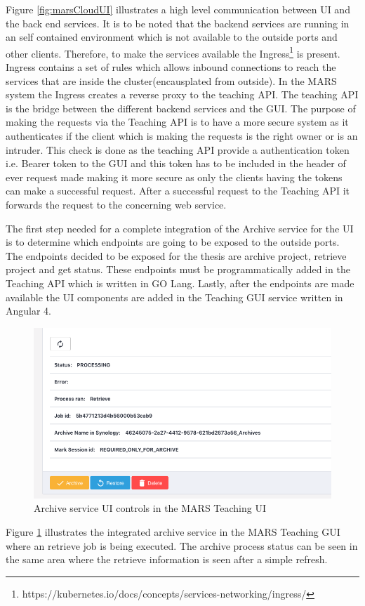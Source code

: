 Figure \ref{fig:marsCloudUI} illustrates a high level communication between UI and the back end services. It is to be noted that the backend services
are running in an self contained environment which is not available to the outside ports and other clients. Therefore, 
to make the services available the Ingress\footnote{https://kubernetes.io/docs/concepts/services-networking/ingress/} is present. Ingress contains
a set of rules which allows inbound connections to reach the services that are inside the cluster(encausplated from outside). In the MARS system
the Ingress creates a reverse proxy to the teaching API. The teaching API is the bridge between the different backend services and the GUI. The purpose
of making the requests via the Teaching API is to have a more secure system as it authenticates if the client which is making the requests is the right owner or 
is an intruder. This check is done as the teaching API provide a authentication token i.e. Bearer token to the GUI and this token has to be included in the
header of ever request made making it more secure as only the clients having the tokens can make a successful request. After a successful request to the Teaching API
it forwards the request to the concerning web service.


The first step needed for a complete integration of the Archive service for the UI is to determine which endpoints are going to be exposed to the outside ports.
The endpoints decided to be exposed for the thesis are archive project, retrieve project and get status. These endpoints must be programmatically added
in the Teaching API which is written in GO Lang. Lastly, after the endpoints are made available the UI components are added in the Teaching GUI service
written in Angular 4. 

\begin{figure}[H]
    \centering \includegraphics[scale=0.5]{grafiken/archiveUI.png}
    \caption{Archive service UI controls in the MARS Teaching UI}
    \label{fig:archiveUI}
\end{figure}

Figure \ref{fig:archiveUI} illustrates the integrated archive service in the MARS Teaching GUI where an retrieve job is being executed. The archive process
status can be seen in the same area where the retrieve information is seen after a simple refresh.
